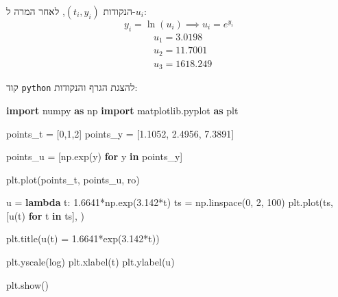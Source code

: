 \documentclass[
]{article}
\newenvironment{Shaded}{}{}
\newcommand{\ControlFlowTok}[1]{\textcolor[rgb]{0.00,0.44,0.13}{\textbf{#1}}}
\newcommand{\DecValTok}[1]{\textcolor[rgb]{0.25,0.63,0.44}{#1}}
\newcommand{\FloatTok}[1]{\textcolor[rgb]{0.25,0.63,0.44}{#1}}
\newcommand{\ImportTok}[1]{\textcolor[rgb]{0.00,0.50,0.00}{\textbf{#1}}}
\newcommand{\KeywordTok}[1]{\textcolor[rgb]{0.00,0.44,0.13}{\textbf{#1}}}
\newcommand{\NormalTok}[1]{#1}
\newcommand{\OperatorTok}[1]{\textcolor[rgb]{0.40,0.40,0.40}{#1}}
\newcommand{\StringTok}[1]{\textcolor[rgb]{0.25,0.44,0.63}{#1}}
\begin{document}
הנקודות \((t_{i},y_{i})\), לאחר המרה ל-\(u_{i}\):
\[y_{i}=\ln(u_{i})\implies u_{i}=e^{y_{i}}\] \[\begin{aligned}
 & u_{1}=3.0198 \\
 & u_{2}=11.7001 \\
 & u_{3}=1618.249
\end{aligned}\]

קוד \texttt{python} להצגת הגרף והנקודות:

\begin{Shaded}
\begin{Highlighting}[]
\ImportTok{import}\NormalTok{ numpy }\ImportTok{as}\NormalTok{ np}
\ImportTok{import}\NormalTok{ matplotlib.pyplot }\ImportTok{as}\NormalTok{ plt}

\NormalTok{points\_t }\OperatorTok{=}\NormalTok{ [}\DecValTok{0}\NormalTok{,}\DecValTok{1}\NormalTok{,}\DecValTok{2}\NormalTok{]}
\NormalTok{points\_y }\OperatorTok{=}\NormalTok{ [}\FloatTok{1.1052}\NormalTok{, }\FloatTok{2.4956}\NormalTok{, }\FloatTok{7.3891}\NormalTok{]}

\NormalTok{points\_u }\OperatorTok{=}\NormalTok{ [np.exp(y) }\ControlFlowTok{for}\NormalTok{ y }\KeywordTok{in}\NormalTok{ points\_y]}

\NormalTok{plt.plot(points\_t, points\_u, }\StringTok{\textquotesingle{}ro\textquotesingle{}}\NormalTok{)}

\NormalTok{u }\OperatorTok{=} \KeywordTok{lambda}\NormalTok{ t: }\FloatTok{1.6641}\OperatorTok{*}\NormalTok{np.exp(}\FloatTok{3.142}\OperatorTok{*}\NormalTok{t)}
\NormalTok{ts }\OperatorTok{=}\NormalTok{ np.linspace(}\DecValTok{0}\NormalTok{, }\DecValTok{2}\NormalTok{, }\DecValTok{100}\NormalTok{)}
\NormalTok{plt.plot(ts, [u(t) }\ControlFlowTok{for}\NormalTok{ t }\KeywordTok{in}\NormalTok{ ts], }\StringTok{\textquotesingle{}{-}\textquotesingle{}}\NormalTok{)}

\NormalTok{plt.title(}\StringTok{\textquotesingle{}u(t) = 1.6641*exp(3.142*t)\textquotesingle{}}\NormalTok{)}

\NormalTok{plt.yscale(}\StringTok{\textquotesingle{}log\textquotesingle{}}\NormalTok{)}
\NormalTok{plt.xlabel(}\StringTok{\textquotesingle{}t\textquotesingle{}}\NormalTok{)}
\NormalTok{plt.ylabel(}\StringTok{\textquotesingle{}u\textquotesingle{}}\NormalTok{)}

\NormalTok{plt.show()}
\end{Highlighting}
\end{Shaded}
\end{document}
